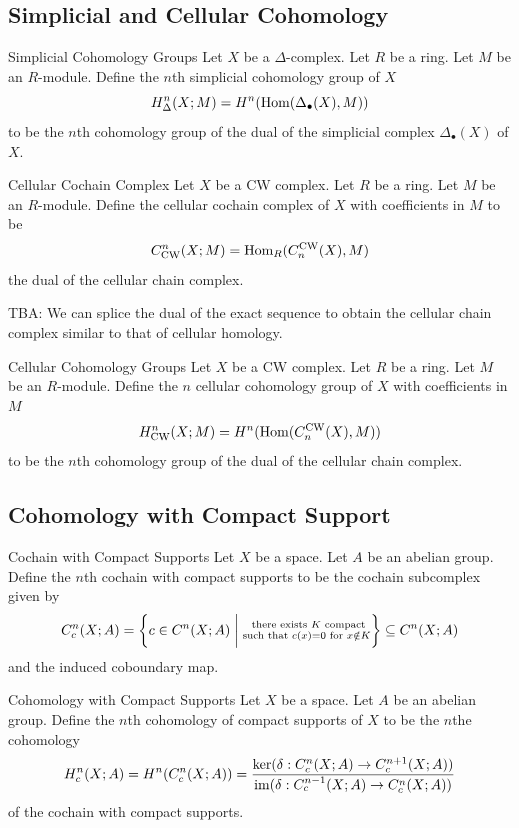 \documentclass[a4paper]{article}
\begin{document}
\subsection{Simplicial and Cellular Cohomology}
\begin{defn}{Simplicial Cohomology Groups}{} Let $X$ be a $\Delta$-complex. Let $R$ be a ring. Let $M$ be an $R$-module. Define the $n$th simplicial cohomology group of $X$ $$H_\Delta^n(X;M)=H^n(\operatorname{Hom}(\Delta_\bullet(X),M))$$ to be the $n$th cohomology group of the dual of the simplicial complex $\Delta_\bullet(X)$ of $X$. 
\end{defn}

\begin{defn}{Cellular Cochain Complex}{} Let $X$ be a CW complex. Let $R$ be a ring. Let $M$ be an $R$-module. Define the cellular cochain complex of $X$ with coefficients in $M$ to be $$C_\text{CW}^n(X;M)=\operatorname{Hom}_R(C_n^\text{CW}(X),M)$$ the dual of the cellular chain complex. 
\end{defn}

TBA: We can splice the dual of the exact sequence to obtain the cellular chain complex similar to that of cellular homology. 

\begin{defn}{Cellular Cohomology Groups}{} Let $X$ be a CW complex. Let $R$ be a ring. Let $M$ be an $R$-module. Define the $n$ cellular cohomology group of $X$ with coefficients in $M$ $$H_\text{CW}^n(X;M)=H^n(\operatorname{Hom}(C_n^\text{CW}(X),M))$$ to be the $n$th cohomology group of the dual of the cellular chain complex. 
\end{defn}

\subsection{Cohomology with Compact Support}
\begin{defn}{Cochain with Compact Supports}{} Let $X$ be a space. Let $A$ be an abelian group. Define the $n$th cochain with compact supports to be the cochain subcomplex given by $$C_c^n(X;A)=\left\{c\in C^n(X;A)\;\bigg{|}\;\substack{\text{ there exists }K\text{ compact}\\\text{such that }c(x)=0\text{ for }x\notin K}\right\}\subseteq C^n(X;A)$$ and the induced coboundary map. 
\end{defn}

\begin{defn}{Cohomology with Compact Supports}{} Let $X$ be a space. Let $A$ be an abelian group. Define the $n$th cohomology of compact supports of $X$ to be the $n$the cohomology $$H_c^n(X;A)=H^n(C_c^n(X;A))=\frac{\ker(\delta:C_c^n(X;A)\to C_c^{n+1}(X;A))}{\operatorname{im}(\delta:C_c^{n-1}(X;A)\to C_c^n(X;A))}$$ of the cochain with compact supports. 
\end{defn}
\end{document}
